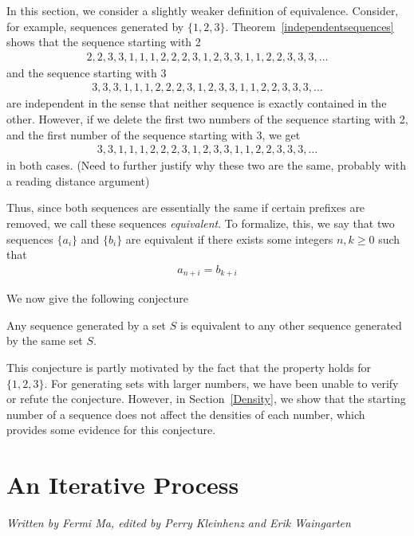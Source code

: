 \documentclass[runningheads,a4paper]{llncs}
\begin{document}
In this section, we consider a slightly weaker definition of equivalence. Consider, for example, sequences generated by $\{1,2,3\}$. Theorem~\ref{independentsequences} shows that the sequence starting with 2
\begin{align*}
2,2,3,3,1,1,1,2,2,2,3,1,2,3,3,1,1,2,2,3,3,3,\dots
\end{align*}
and the sequence starting with 3
\begin{align*}
3,3,3,1,1,1,2,2,2,3,1,2,3,3,1,1,2,2,3,3,3,\dots
\end{align*}
are independent in the sense that neither sequence is exactly contained in the other. However, if we delete the first two numbers of the sequence starting with 2, and the first number of the sequence starting with 3, we get 
\begin{align*}
3,3,1,1,1,2,2,2,3,1,2,3,3,1,1,2,2,3,3,3,\dots
\end{align*}
in both cases. (Need to further justify why these two are the same, probably with a reading distance argument)

Thus, since both sequences are essentially the same if certain prefixes are removed, we call these sequences \emph{equivalent}. To formalize, this, we say that two sequences $\{a_i\}$ and $\{b_i\}$ are equivalent if there exists some integers $n,k \geq 0$ such that
\begin{align*}
a_{n+i} = b_{k+i}
\end{align*}

We now give the following conjecture

\begin{conjecture} Any sequence generated by a set $S$ is equivalent to any other sequence generated by the same set $S$.
\end{conjecture}

This conjecture is partly motivated by the fact that the property holds for $\{1,2,3\}$. For generating sets with larger numbers, we have been unable to verify or refute the conjecture. However, in Section~\ref{Density}, we show that the starting number of a sequence does not affect the densities of each number, which provides some evidence for this conjecture.

\section{An Iterative Process}
\label{iterativeprocess}

\emph{Written by Fermi Ma, edited by Perry Kleinhenz and Erik Waingarten}
\end{document}
